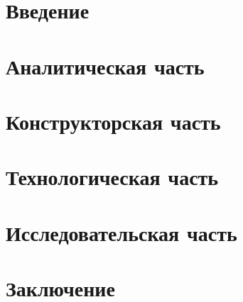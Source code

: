\documentclass[12pt]{report}
\begin{document}
	\renewcommand\bibname{Список литературы}
	
	
	
	\tableofcontents
	\newpage
	
	\chapter*{Введение}
	
	\newpage
	
	\chapter{Аналитическая часть}
	
	\newpage
	
	\chapter{Конструкторская часть}
	\newpage
	
	\chapter{Технологическая часть}
	\newpage
	
	\chapter{Исследовательская часть}
	\newpage
	
	\chapter*{Заключение}
	\newpage
	
\end{document}
